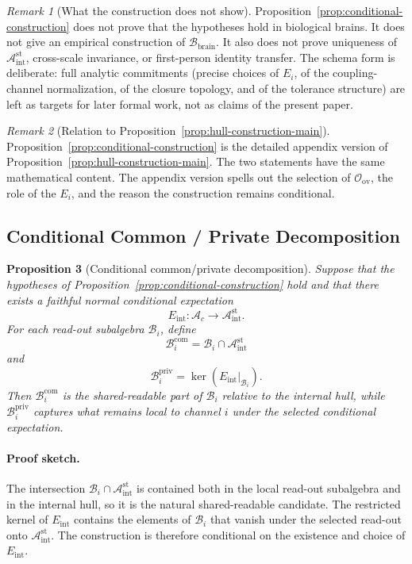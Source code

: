 \documentclass[12pt]{article}
\newtheorem{proposition}{Proposition}[section]
\theoremstyle{definition}
\theoremstyle{remark}
\newtheorem{remark}[proposition]{Remark}
\newcommand{\Ac}{\mathcal A_c}
\newcommand{\Bbrain}{\mathcal B_{\mathrm{brain}}}
\newcommand{\Bint}{\mathcal A_{\mathrm{int}}^{\mathrm{st}}}
\begin{document}
\begin{remark}[What the construction does not show]
Proposition~\ref{prop:conditional-construction} does not prove that
the hypotheses hold in biological brains. It does not give an empirical
construction of \(\Bbrain\). It also does not prove uniqueness of
\(\Bint\), cross-scale invariance, or first-person identity transfer.
The schema form is deliberate: full analytic commitments (precise
choices of \(E_i\), of the coupling-channel normalization, of the
closure topology, and of the tolerance structure) are left as targets
for later formal work, not as claims of the present paper.
\end{remark}

\begin{remark}[Relation to Proposition~\ref{prop:hull-construction-main}]
Proposition~\ref{prop:conditional-construction} is the detailed
appendix version of Proposition~\ref{prop:hull-construction-main}. The
two statements have the same mathematical content. The appendix version
spells out the selection of \(\mathcal O_{\mathrm{ov}}\), the role of
the \(E_i\), and the reason the construction remains conditional.
\end{remark}

\subsection{Conditional Common / Private Decomposition}

\begin{proposition}[Conditional common/private decomposition]
\label{prop:common-private-appendix}
Suppose that the hypotheses of
Proposition~\ref{prop:conditional-construction} hold and that there
exists a faithful normal conditional expectation
\[
E_{\mathrm{int}}:\Ac\to\Bint.
\]
For each read-out subalgebra \(\mathcal B_i\), define
\[
\mathcal B_i^{\mathrm{com}}
=
\mathcal B_i \cap \Bint
\]
and
\[
\mathcal B_i^{\mathrm{priv}}
=
\ker(E_{\mathrm{int}}|_{\mathcal B_i}).
\]
Then \(\mathcal B_i^{\mathrm{com}}\) is the shared-readable part of
\(\mathcal B_i\) relative to the internal hull, while
\(\mathcal B_i^{\mathrm{priv}}\) captures what remains local to channel
\(i\) under the selected conditional expectation.
\end{proposition}

\paragraph{Proof sketch.}
The intersection \(\mathcal B_i\cap\Bint\) is contained both in the
local read-out subalgebra and in the internal hull, so it is the natural
shared-readable candidate. The restricted kernel of \(E_{\mathrm{int}}\)
contains the elements of \(\mathcal B_i\) that vanish under the selected
read-out onto \(\Bint\). The construction is therefore conditional on
the existence and choice of \(E_{\mathrm{int}}\).
\end{document}
